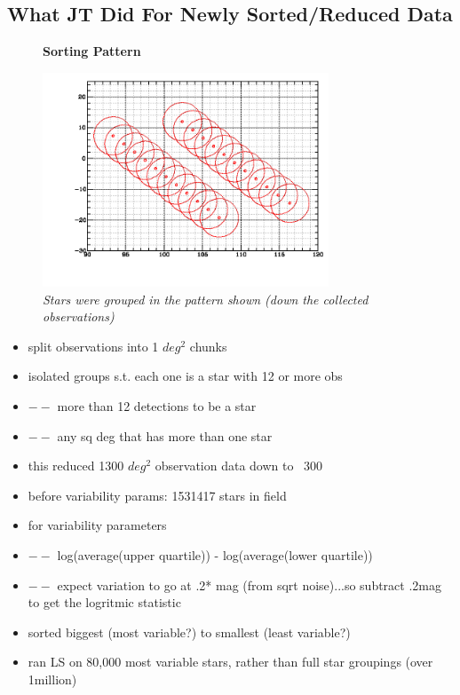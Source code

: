\documentclass[aps,prl,twocolumn,superscriptaddress]{revtex4-1}
\begin{document}
\subsection{What JT Did For Newly Sorted/Reduced Data}

\begin{figure}[H]
 \centering
 \textbf{Sorting Pattern}\par\medskip
 	\includegraphics[width=3.35in]{figures/fromJT/sortedFOV.png}
 \caption{\it \small{Stars were grouped in the pattern shown (down the collected observations)}}
 \label{fig:sortpat}
\end{figure}

\begin{itemize}
 \item{} split observations into 1 $deg^2$ chunks
 \item{} isolated groups s.t. each one is a star with 12 or more obs
 \item{} $--$ more than 12 detections to be a star
 \item{} $--$ any sq deg that has more than one star
 \item{} this reduced 1300 $deg^2$ observation data down to ~300
 \item{} before variability params: 1531417 stars in field
 \item{} for variability parameters
 \item{} $--$ log(average(upper quartile)) - log(average(lower quartile))
 \item{} $--$ expect variation to go at .2* mag (from sqrt noise)...so subtract .2mag to get the logritmic statistic
 \item{} sorted biggest (most variable?) to smallest (least variable?)
 \item{} ran LS on 80,000 most variable stars, rather than full star groupings (over 1million)
\end{itemize}
\end{document}
